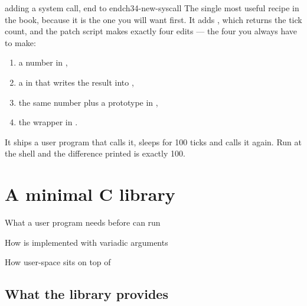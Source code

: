 \begin{recipe}{adding a system call, end to end}{ch34-new-syscall}
The single most useful recipe in the book, because it is the one you will want first. It adds
, which returns the tick count, and the patch script makes exactly four edits
--- the four you always have to make:

\begin{enumerate}
  \item a number in ,
  \item a  in  that writes the result into ,
  \item the same number plus a prototype in ,
  \item the wrapper in .
\end{enumerate}

It ships a user program that calls it, sleeps for 100 ticks and calls it again. Run
 at the shell and the difference printed is exactly 100.
\end{recipe}

\chapter{A minimal C library}

\begin{goals}
  \item What a user program needs before  can run
  \item How  is implemented with variadic arguments
  \item How user-space  sits on top of 
\end{goals}

\section{What the library provides}

